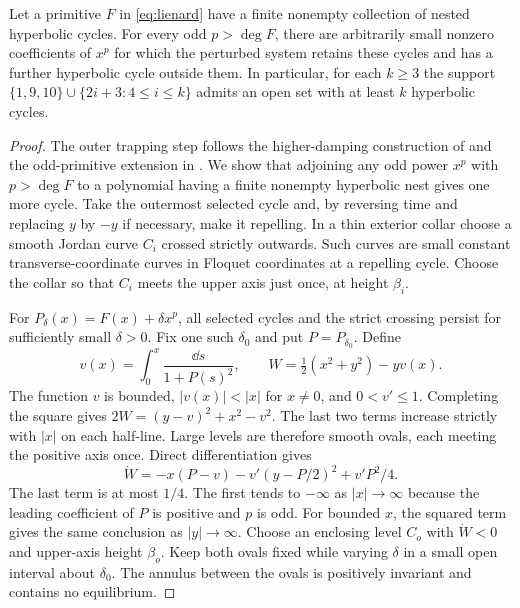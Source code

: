 \hypertarget{outer.extension}{}
\begin{proposition}\label{prop:outer-extension}
Let a primitive $F$ in \eqref{eq:lienard} have a finite nonempty
collection of nested hyperbolic cycles. For every odd $p>\deg F$, there
are arbitrarily small nonzero coefficients of $x^p$ for which the
perturbed system retains these cycles and has a further hyperbolic
cycle outside them. In particular, for each $k\ge3$ the support
$\{1,9,10\}\cup\{2i+3:4\le i\le k\}$ admits an open set with at least
$k$ hyperbolic cycles.
\end{proposition}
\begin{proof}
The outer trapping step follows the higher-damping construction of
\cite[Remark~1.2]{DPR} and the odd-primitive extension in
\cite[\S3.2]{DMH}. We show that adjoining any odd power $x^p$ with $p>\deg F$ to a
polynomial having a finite nonempty hyperbolic nest gives one more cycle.
Take the outermost selected cycle and, by reversing time and replacing
$y$ by $-y$ if necessary, make it repelling. In a thin exterior collar
choose a smooth Jordan curve $C_i$ crossed strictly outwards. Such curves
are small constant transverse-coordinate curves in Floquet coordinates
at a repelling cycle. Choose the collar so that $C_i$ meets the upper
axis just once, at height $\beta_i$.

For $P_\delta(x)=F(x)+\delta x^p$, all selected cycles and the strict
crossing persist for sufficiently small $\delta>0$. Fix one such
$\delta_0$ and put $P=P_{\delta_0}$. Define
\[
 v(x)=\int_0^x\frac{\dd s}{1+P(s)^2},\qquad
 W=\tfrac12(x^2+y^2)-yv(x).
\]
The function $v$ is bounded, $|v(x)|<|x|$ for $x\ne0$, and
$0<v'\le1$. Completing the square gives
$2W=(y-v)^2+x^2-v^2$. The last two terms increase strictly with $|x|$
on each half-line. Large levels are therefore smooth ovals, each meeting
the positive axis once. Direct differentiation gives
\[
 \dot W=-x(P-v)-v'(y-P/2)^2+v'P^2/4 .
\]
The last term is at most $1/4$. The first tends to $-\infty$ as
$|x|\to\infty$ because the leading coefficient of $P$ is positive and
$p$ is odd. For bounded $x$, the squared term gives the same conclusion
as $|y|\to\infty$. Choose an enclosing level $C_o$ with $\dot W<0$ and
upper-axis height $\beta_o$. Keep both ovals fixed while varying $\delta$
in a small open interval about $\delta_0$. The annulus between the ovals
is positively invariant and contains no equilibrium.


\end{proof}
